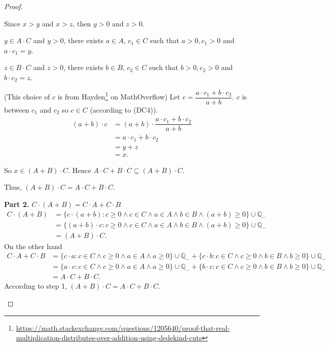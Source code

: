 \begin{proof}
\begin{enumerate}[label={(F\arabic*)}, start=5]
\begin{itemize}
                        Since $x > y$ and $x > z$, then $y > 0$ and $z > 0$.
              \end{itemize}

              $y\in A\cdot C$ and $y > 0$, there exists $a\in A$, $c_{1}\in C$ such that $a > 0, c_{1} > 0$ and $a\cdot c_{1} = y$.

              $z\in B\cdot C$ and $z > 0$, there exists $b\in B$, $c_{2}\in C$ such that $b > 0, c_{2} > 0$ and $b\cdot c_{2} = z$.

              (This choice of $c$ is from Hayden\footnote{\url{https://math.stackexchange.com/questions/1205640/proof-that-real-multiplication-distributes-over-addition-using-dedekind-cuts}} on MathOverflow) Let $c = \dfrac{a\cdot c_{1} + b\cdot c_{2}}{a + b}$. $c$ is between $c_{1}$ and $c_{2}$ so $c\in C$ (according to (DC4)).
              \begin{align*}
                  (a + b)\cdot c & = (a + b)\cdot\dfrac{a\cdot c_{1} + b\cdot c_{2}}{a + b} \\
                                 & = a\cdot c_{1} + b\cdot c_{2}                            \\
                                 & = y + z                                                  \\
                                 & = x.
              \end{align*}

              So $x\in (A + B)\cdot C$. Hence $A\cdot C + B\cdot C\subseteq (A + B)\cdot C$.

              Thus, $(A + B)\cdot C = A\cdot C + B\cdot C$.

              \bigskip

              \textbf{Part 2. $C\cdot (A + B) = C\cdot A + C\cdot B$}
              \begin{align*}
                  C\cdot (A + B) & = \{ c\cdot (a + b) : c\ge 0\land c\in C\land a\in A\land b\in B\land (a+b)\ge 0 \}\cup\mathbb{Q}_{-} \\
                                 & = \{ (a + b)\cdot c : c\ge 0\land c\in C\land a\in A\land b\in B\land (a+b)\ge 0 \}\cup\mathbb{Q}_{-} \\
                                 & = (A + B)\cdot C.
              \end{align*}
              On the other hand
              \begin{align*}
                  C\cdot A + C\cdot B & = \{ c\cdot a : c\in C\land c\ge 0\land a\in A\land a\ge 0 \}\cup\mathbb{Q}_{-} + \{ c\cdot b :  c\in C\land c\ge 0\land b\in B\land b\ge 0 \}\cup\mathbb{Q}_{-} \\
                                      & = \{ a\cdot c : c\in C\land c\ge 0\land a\in A\land a\ge 0 \}\cup\mathbb{Q}_{-} + \{ b\cdot c :  c\in C\land c\ge 0\land b\in B\land b\ge 0 \}\cup\mathbb{Q}_{-} \\
                                      & = A\cdot C + B\cdot C.
              \end{align*}
              According to step 1, $(A + B)\cdot C = A\cdot C + B\cdot C$.


\end{enumerate}
\end{proof}
